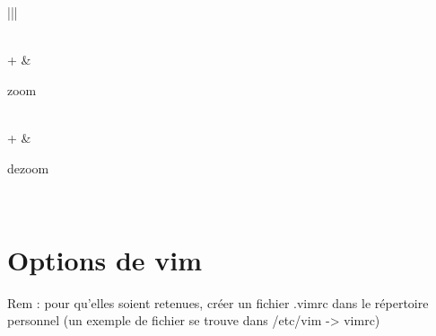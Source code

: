 \documentclass[letterpaper,10pt,french]{sphinxmanual}
\begin{document}
\begin{savenotes}\sphinxattablestart
\centering
\begin{tabular}[t]{|*{2}{|}}
\hline
{}%
%
\sphinxstopmulticolumn
\\
\hline
{} + \sphinxcode{\sphinxupquote{+}}
&
\begin{DUlineblock}{0em}
\item[] zoom
\end{DUlineblock}
\\
\hline
{} + \sphinxcode{\sphinxupquote{-}}
&
\begin{DUlineblock}{0em}
\item[] dezoom
\end{DUlineblock}
\\
\hline
\end{tabular}
\par
\sphinxattableend\end{savenotes}


\section{Options de vim}
\label{\detokenize{20-vim:options-de-vim}}
Rem : pour qu’elles soient retenues, créer un fichier .vimrc dans le répertoire personnel (un exemple de fichier se trouve dans /etc/vim -\textgreater{} vimrc)
\end{document}
